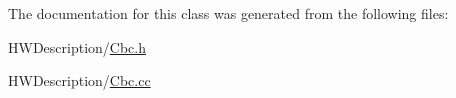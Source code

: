 The documentation for this class was generated from the following files\-:\begin{DoxyCompactItemize}
\item 
H\-W\-Description/\hyperlink{_cbc_8h}{Cbc.\-h}\item 
H\-W\-Description/\hyperlink{_cbc_8cc}{Cbc.\-cc}\end{DoxyCompactItemize}

